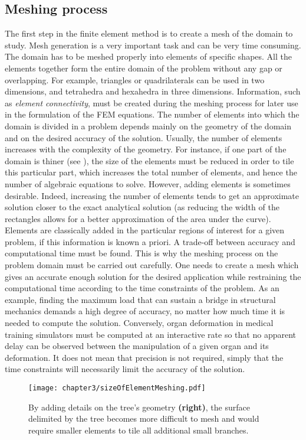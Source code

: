	\subsection{Meshing process}
The first step in the finite element method is to create a mesh of the domain to study. Mesh generation is a very important task and can be very time consuming. The domain has to be meshed properly into elements of specific shapes. All the elements together form the entire domain of the problem without any gap or overlapping. For example, triangles or quadrilaterals can be used in two dimensions, and tetrahedra and hexahedra in three dimensions. Information, such as \emph{element connectivity}, must be created during the meshing process for later use in the formulation of the FEM equations. The number of elements into which the domain is divided in a problem depends mainly on the geometry of the domain and on the desired accuracy of the solution. Usually, the number of elements increases with the complexity of the geometry. For instance, if one part of the domain is thiner (see ), the size of the elements must be reduced in order to tile this particular part, which increases the total number of elements, and hence  the number of algebraic equations to solve. However, adding elements is sometimes desirable. Indeed, increasing the number of elements tends to get an approximate solution closer to the exact analytical solution (as reducing the width of the rectangles allows for a better approximation of the area under the curve). Elements are classically added in the particular regions of interest for a given problem, if this information is known a priori. A trade-off between accuracy and computational time must be found. This is why the meshing process on the problem domain must be carried out carefully. One needs to create a mesh which gives an accurate enough solution for the desired application while restraining the computational time according to the time constraints of the problem. As an example, finding the maximum load that can sustain a bridge in structural mechanics demands a high degree of accuracy, no matter how much time it is needed to compute the solution. Conversely, organ deformation in medical training simulators must be computed at an interactive rate so that no apparent delay can be observed between the manipulation of a given organ and its deformation. It does not mean that precision is not required, simply that the time constraints will necessarily limit the accuracy of the solution. 
%
\begin{figure}[h]
\begin{center}
\texttt{[image: chapter3/sizeOfElementMeshing.pdf]}
\end{center}
\caption[Finer mesh required for complex geometry]{By adding details on the tree's geometry \textbf{(right)}, the surface delimited by the tree becomes more difficult to mesh and would require smaller elements to tile all additional small branches.}
\label{chap3:fig-sizeOfElementMeshing}
\end{figure}


